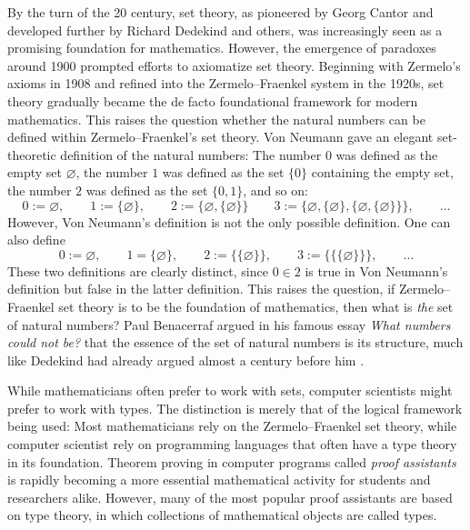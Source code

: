 By the turn of the 20\supth{} century, set theory, as pioneered by Georg Cantor and developed further by Richard Dedekind and others, was increasingly seen as a promising foundation for mathematics. However, the emergence of paradoxes around 1900 prompted efforts to axiomatize set theory. Beginning with Zermelo's axioms in 1908 and refined into the Zermelo--Fraenkel system in the 1920s, set theory gradually became the de facto foundational framework for modern mathematics. This raises the question whether the natural numbers can be defined within Zermelo--Fraenkel's set theory. Von Neumann gave an elegant set-theoretic definition of the natural numbers: The number $0$ was defined as the empty set $\varnothing$, the number $1$ was defined as the set $\{0\}$ containing the empty set, the number $2$ was defined as the set $\{0,1\}$, and so on:
\begin{equation*}
  0:=\varnothing,\qquad 1:=\{\varnothing\},\qquad 2:=\{\varnothing,\{\varnothing\}\}\qquad 3:=\{\varnothing,\{\varnothing\},\{\varnothing,\{\varnothing\}\}\},\qquad\ldots
\end{equation*}
However, Von Neumann's definition is not the only possible definition. One can also define
\begin{equation*}
  0:=\varnothing,\qquad 1=\{\varnothing\}, \qquad 2:=\{\{\varnothing\}\},\qquad 3 := \{\{\{\varnothing\}\}\},\qquad\ldots
\end{equation*}
These two definitions are clearly distinct, since $0\in 2$ is true in Von Neumann's definition but false in the latter definition. This raises the question, if Zermelo--Fraenkel set theory is to be the foundation of mathematics, then what is \emph{the} set of natural numbers? Paul Benacerraf argued in his famous essay \emph{What numbers could not be?} that the essence of the set of natural numbers is its structure, much like Dedekind had already argued almost a century before him \cite{benacerraf1965}.

While mathematicians often prefer to work with sets, computer scientists might prefer to work with types.  The distinction is merely that of the logical framework being used: Most mathematicians rely on the Zermelo--Fraenkel set theory, while computer scientist rely on programming languages that often have a type theory in its foundation. Theorem proving in computer programs called \emph{proof assistants} is rapidly becoming a more essential mathematical activity for students and researchers alike. However, many of the most popular proof assistants are based on type theory, in which collections of mathematical objects are called types.

